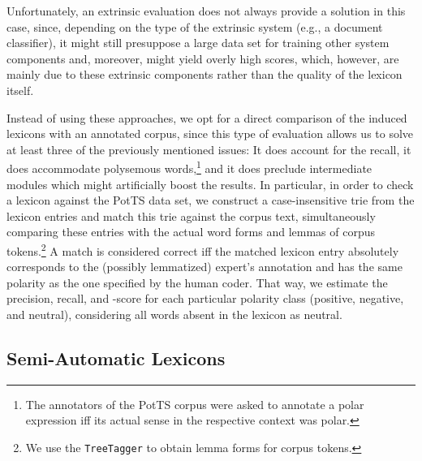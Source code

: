 Unfortunately, an extrinsic evaluation does not always provide a
solution in this case, since, depending on the type of the extrinsic
system (e.g., a document classifier), it might still presuppose a
large data set for training other system components and, moreover,
might yield overly high scores, which, however, are mainly due to
these extrinsic components rather than the quality of the lexicon
itself.

Instead of using these approaches, we opt for a direct comparison of
the induced lexicons with an annotated corpus, since this type of
evaluation allows us to solve at least three of the previously
mentioned issues: It does account for the recall, it does accommodate
polysemous words,\footnote{The annotators of the PotTS corpus were
  asked to annotate a polar expression iff its actual sense in the
  respective context was polar.} and it does preclude intermediate
modules which might artificially boost the results.  In particular, in
order to check a lexicon against the PotTS data set, we construct a
case-insensitive trie \cite[pp. 492--512]{Knuth:98} from the lexicon
entries and match this trie against the corpus text, simultaneously
comparing these entries with the actual word forms and lemmas of
corpus tokens.\footnote{We use the \texttt{TreeTagger}
  \cite{Schmid:95} to obtain lemma forms for corpus tokens.} A match
is considered correct iff the matched lexicon entry absolutely
corresponds to the (possibly lemmatized) expert's annotation and has
the same polarity as the one specified by the human coder.  That way,
we estimate the precision, recall, and \F{}-score for each particular
polarity class (positive, negative, and neutral), considering all
words absent in the lexicon as neutral.

\subsection{Semi-Automatic Lexicons}

